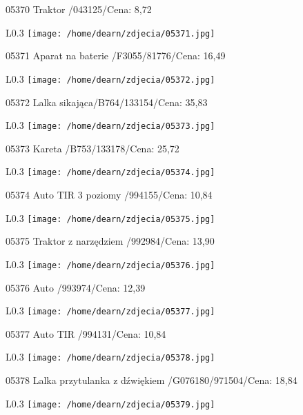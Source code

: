 05370 Traktor  /043125/Cena: 8,72\newline
\begin{wrapfigure}{L}{0.3\textwidth}
\texttt{[image: /home/dearn/zdjecia/05371.jpg]}
\end{wrapfigure}
05371 Aparat na baterie /F3055/81776/Cena: 16,49\newline
\begin{wrapfigure}{L}{0.3\textwidth}
\texttt{[image: /home/dearn/zdjecia/05372.jpg]}
\end{wrapfigure}
05372 Lalka sikająca/B764/133154/Cena: 35,83\newline
\begin{wrapfigure}{L}{0.3\textwidth}
\texttt{[image: /home/dearn/zdjecia/05373.jpg]}
\end{wrapfigure}
05373 Kareta /B753/133178/Cena: 25,72\newline
\begin{wrapfigure}{L}{0.3\textwidth}
\texttt{[image: /home/dearn/zdjecia/05374.jpg]}
\end{wrapfigure}
05374 Auto TIR 3 poziomy /994155/Cena: 10,84\newline
\begin{wrapfigure}{L}{0.3\textwidth}
\texttt{[image: /home/dearn/zdjecia/05375.jpg]}
\end{wrapfigure}
05375 Traktor z narzędziem  /992984/Cena: 13,90\newline
\begin{wrapfigure}{L}{0.3\textwidth}
\texttt{[image: /home/dearn/zdjecia/05376.jpg]}
\end{wrapfigure}
05376 Auto /993974/Cena: 12,39\newline
\begin{wrapfigure}{L}{0.3\textwidth}
\texttt{[image: /home/dearn/zdjecia/05377.jpg]}
\end{wrapfigure}
05377 Auto TIR /994131/Cena: 10,84\newline
\begin{wrapfigure}{L}{0.3\textwidth}
\texttt{[image: /home/dearn/zdjecia/05378.jpg]}
\end{wrapfigure}
05378 Lalka przytulanka z dźwiękiem /G076180/971504/Cena: 18,84\newline
\begin{wrapfigure}{L}{0.3\textwidth}
\texttt{[image: /home/dearn/zdjecia/05379.jpg]}
\end{wrapfigure}
